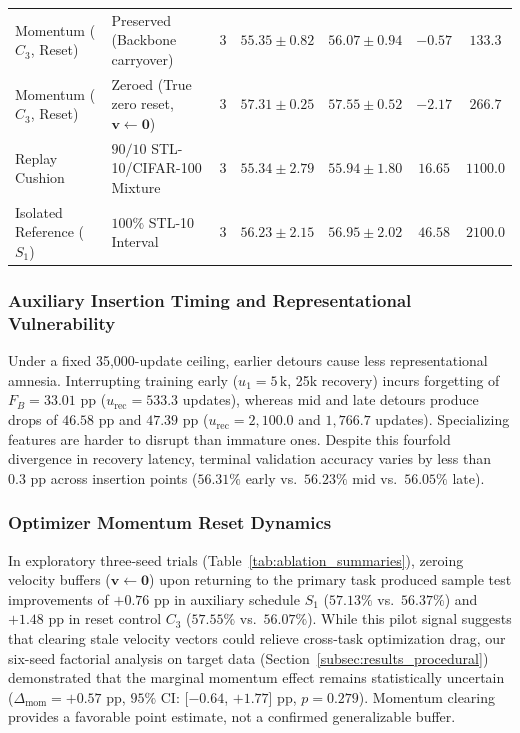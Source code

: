 \documentclass[sn-mathphys,Numbered]{sn-jnl}
\begin{document}
\begin{table}[t]
{\begin{tabular}{llccccc}
Momentum ($C_3$, Reset)        & Preserved (Backbone carryover)                       & 3 & $55.35 \pm 0.82$ & $56.07 \pm 0.94$ & $-0.57$ & $133.3$ \\
Momentum ($C_3$, Reset)        & Zeroed (True zero reset, $\bm{v} \leftarrow \mathbf{0}$) & 3 & $\bm{57.31 \pm 0.25}$ & $\bm{57.55 \pm 0.52}$ & $-2.17$ & $266.7$ \\
\midrule
Replay Cushion                 & $90/10$ STL-10/CIFAR-100 Mixture                     & 3 & $55.34 \pm 2.79$ & $55.94 \pm 1.80$ & $\bm{16.65}$ & $\bm{1100.0}$ \\
Isolated Reference ($S_1$)     & $100\%$ STL-10 Interval                              & 3 & $56.23 \pm 2.15$ & $56.95 \pm 2.02$ & $46.58$ & $2100.0$ \\
\bottomrule
\end{tabular}%
}
\end{table}

\subsubsection{Auxiliary Insertion Timing and Representational Vulnerability}
Under a fixed 35,000-update ceiling, earlier detours cause less representational amnesia. Interrupting training early ($u_1 = 5\,\mathrm{k}$, 25k recovery) incurs forgetting of $F_B = 33.01$ pp ($u_{\mathrm{rec}} = 533.3$ updates), whereas mid and late detours produce drops of $46.58$ pp and $47.39$ pp ($u_{\mathrm{rec}} = 2{,}100.0$ and $1{,}766.7$ updates). Specializing features are harder to disrupt than immature ones. Despite this fourfold divergence in recovery latency, terminal validation accuracy varies by less than $0.3$ pp across insertion points ($56.31\%$ early vs.\ $56.23\%$ mid vs.\ $56.05\%$ late).

\subsubsection{Optimizer Momentum Reset Dynamics}
In exploratory three-seed trials (Table~\ref{tab:ablation_summaries}), zeroing velocity buffers ($\bm{v} \leftarrow \mathbf{0}$) upon returning to the primary task produced sample test improvements of $+0.76$ pp in auxiliary schedule $S_1$ ($57.13\%$ vs.\ $56.37\%$) and $+1.48$ pp in reset control $C_3$ ($57.55\%$ vs.\ $56.07\%$). While this pilot signal suggests that clearing stale velocity vectors could relieve cross-task optimization drag, our six-seed factorial analysis on target data (Section~\ref{subsec:results_procedural}) demonstrated that the marginal momentum effect remains statistically uncertain ($\Delta_{\mathrm{mom}} = +0.57$ pp, $95\%$ CI: [$-0.64$, $+1.77$] pp, $p = 0.279$). Momentum clearing provides a favorable point estimate, not a confirmed generalizable buffer.
\end{document}
